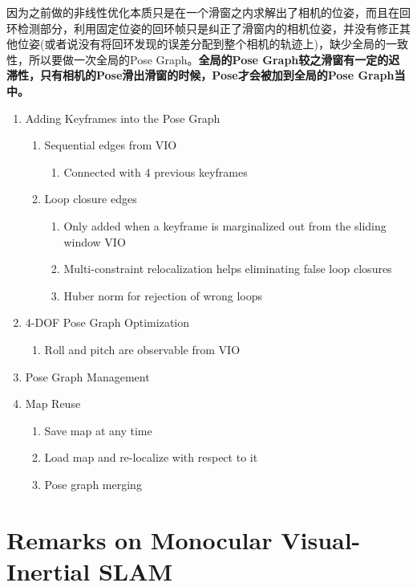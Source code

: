 \documentclass[12pt,a4paper]{article}
\begin{document}
因为之前做的非线性优化本质只是在一个滑窗之内求解出了相机的位姿，而且在回环检测部分，利用固定位姿的回环帧只是纠正了滑窗内的相机位姿，并没有修正其他位姿(或者说没有将回环发现的误差分配到整个相机的轨迹上)，缺少全局的一致性，所以要做一次全局的Pose Graph。\textbf{全局的Pose Graph较之滑窗有一定的迟滞性，只有相机的Pose滑出滑窗的时候，Pose才会被加到全局的Pose Graph当中。}

\begin{enumerate}
\item Adding Keyframes into the Pose Graph

\begin{enumerate}
\item Sequential edges from VIO
  \begin{enumerate}
  \item Connected with 4 previous keyframes
  \end{enumerate}
\item Loop closure edges
  \begin{enumerate}
  \item Only added when a keyframe is marginalized out from the sliding window VIO
  \item Multi-constraint relocalization helps eliminating false loop closures
  \item Huber norm for rejection of wrong loops
  \end{enumerate}
\end{enumerate}

\item 4-DOF Pose Graph Optimization

\begin{enumerate}
\item Roll and pitch are observable from VIO
\end{enumerate}

\item Pose Graph Management

\item Map Reuse

\begin{enumerate}
\item Save map at any time
\item Load map and re-localize with respect to it
\item Pose graph merging
\end{enumerate}

\end{enumerate}

\section{Remarks on Monocular Visual-Inertial SLAM}
\end{document}
